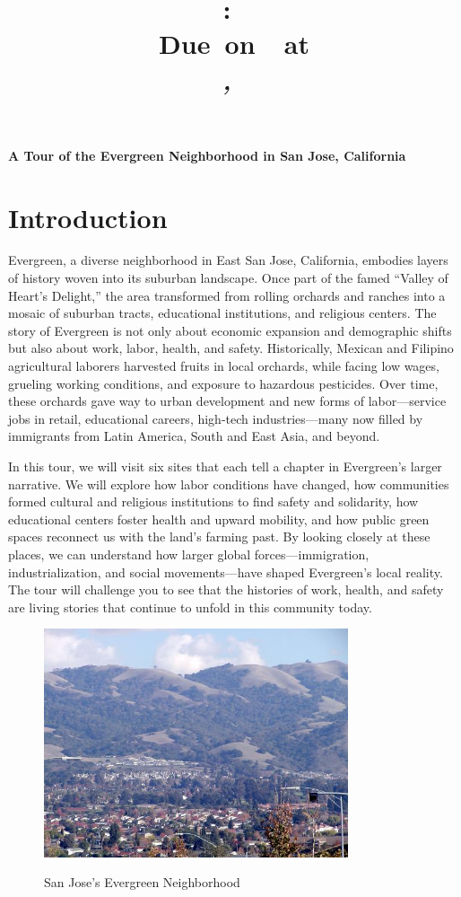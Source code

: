 \documentclass[12pt]{article}
\title{
	\vspace{2in}
	\textmd{\textbf{\hmwkClass:\ \hmwkTitle}}\\
	\normalsize\vspace{0.1in}\small{Due\ on\ \hmwkDueDate\ at \hmwkDueTime}\\
	\vspace{0.1in}\large{\textit{\hmwkClassInstructor,\ \hmwkClassTime}}
	\vspace{3in}
}
\author{\textbf{\hmwkAuthorName}}
\date{\hmwkCompletionDate}
\begin{document}
\maketitle

\pagebreak

\doublespacing

\textbf{\Large A Tour of the Evergreen Neighborhood in San Jose, California}

\section{Introduction}

Evergreen, a diverse neighborhood in East San Jose, California, embodies layers of history woven into its suburban landscape. Once part of the famed “Valley of Heart’s Delight,” the area transformed from rolling orchards and ranches into a mosaic of suburban tracts, educational institutions, and religious centers. The story of Evergreen is not only about economic expansion and demographic shifts but also about work, labor, health, and safety. Historically, Mexican and Filipino agricultural laborers harvested fruits in local orchards, while facing low wages, grueling working conditions, and exposure to hazardous pesticides. Over time, these orchards gave way to urban development and new forms of labor—service jobs in retail, educational careers, high-tech industries—many now filled by immigrants from Latin America, South and East Asia, and beyond.

In this tour, we will visit six sites that each tell a chapter in Evergreen’s larger narrative. We will explore how labor conditions have changed, how communities formed cultural and religious institutions to find safety and solidarity, how educational centers foster health and upward mobility, and how public green spaces reconnect us with the land’s farming past. By looking closely at these places, we can understand how larger global forces—immigration, industrialization, and social movements—have shaped Evergreen’s local reality. The tour will challenge you to see that the histories of work, health, and safety are living stories that continue to unfold in this community today.

\begin{figure}[h]
  \centering
  \includegraphics[width=0.8\textwidth]{assets/evergreen_landscape.png}
  \caption{San Jose's Evergreen Neighborhood}
  \label{fig:evergreen_landscape}
  \cite{eisenberg2011san}
\end{figure}
\end{document}

